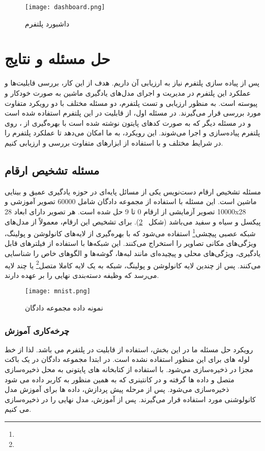 \begin{figure}[!t]
	\centering
	\texttt{[image: dashboard.png]}
	\caption{داشبورد پلتفرم }
	\label{fig: dashboard}
\end{figure}


\section{حل مسئله و نتایج}
 
پس از پیاده سازی پلتفرم  نیاز به ارزیابی آن داریم. هدف از این کار، بررسی قابلیت‌ها و عملکرد این پلتفرم در مدیریت و اجرای مدل‌های یادگیری ماشین به صورت خودکار و پیوسته است. به منظور ارزیابی و تست پلتفرم، دو مسئله مختلف با دو رویکرد متفاوت مورد بررسی قرار می‌گیرند. در مسئله اول، از قابلیت  در این پلتفرم استفاده شده است و در مسئله دیگر که به صورت کدهای پایتون نوشته شده‌ است با بهره‌گیری از ، روی پلتفرم پیاده‌سازی و اجرا می‌شوند. این رویکرد، به ما امکان می‌دهد تا عملکرد پلتفرم را در شرایط مختلف و با استفاده از ابزارهای متفاوت بررسی و ارزیابی کنیم.

\subsection{مسئله تشخیص ارقام}
مسئله تشخیص ارقام دست‌نویس یکی از مسائل پایه‌ای در حوزه یادگیری عمیق و بینایی ماشین است. این مسئله با استفاده از مجموعه دادگان  شامل 60000 تصویر آموزشی و 10000 تصویر آزمایشی از ارقام 0 تا 9 حل شده است. هر تصویر دارای ابعاد 28x28 پیکسل و سیاه و سفید می‌باشد (شکل ~\ref{fig: mnist}). برای تشخیص این ارقام، معمولاً از مدل‌های شبکه عصبی پیچشی\footnote{} استفاده می‌شود که با بهره‌گیری از لایه‌های کانولوشن و پولینگ، ویژگی‌های مکانی تصاویر را استخراج می‌کنند. این شبکه‌ها با استفاده از فیلترهای قابل یادگیری، ویژگی‌های محلی و پیچیده‌ای مانند لبه‌ها، گوشه‌ها و الگوهای خاص را شناسایی می‌کنند. پس از چندین لایه کانولوشن و پولینگ، شبکه به یک لایه کاملا متصل\footnote{} یا چند لایه می‌رسد که وظیفه دسته‌بندی نهایی را بر عهده دارند. 

\begin{figure}[t]
	\centering
	\texttt{[image: mnist.png]}
	\caption{نمونه داده مجموعه دادگان }
	\label{fig: mnist}
\end{figure}

\subsubsection{چرخه‌کاری آموزش}
رویکرد حل مسئله ما در این بخش،‌ استفاده از قابلیت  در پلتفرم می باشد. لذا از خط لوله های  برای این منظور استفاده نشده است. در ابتدا مجموعه دادگان  در یک باکت مجزا در  ذخیره‌سازی می‌شود. با استفاده از کتابخانه های پایتونی به محل ذخیره‌سازی متصل و داده ها گرفته و در کانتینری که به همین منظور به کاربر داده می شود ذخیره‌سازی می‌شود. پس از مرحله پیش پردازش، داده ها برای آموزش مدل کانولوشنی مورد استفاده قرار می‌گیرند. پس از آموزش، مدل نهایی را در  ذخیره‌سازی می کنیم. 
